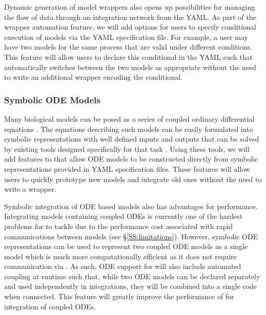 \documentclass[journal]{IEEEtran}
\newcommand{\todo}[1]{{\color{red}{#1}}}
\newcommand{\pkg}{{\tt \todo{cis\_interface}}{}}
\begin{document}
Dynamic generation of model wrappers also opens up possibilities for managing the flow of data through an integration network from the YAML. As part of the wrapper automation feature, we will add options for users to specify conditional execution of models via the YAML specification file. For example, a user may have two models for the same process that are valid under different conditions. This feature will allow users to declare this conditional in the YAML such that {\pkg} automatically switches between the two models as appropriate without the need to write an additional wrapper encoding the conditional.


\subsubsection{Symbolic ODE Models}\label{SS:ODE}
%
Many biological models can be posed as a series of coupled ordinary differential equations \citep[ODEs, ][]{WANG2015}. The equations describing such models can be easily formulated into symbolic representations \citep[e.g. SymPy][]{Meurer2017} with well defined inputs and outputs that can be solved by existing tools designed specifically for that task \citep[e.g. scipy.integrate.ode][]{Jones2001, Hairer1993}. Using these tools, we will add features to {\pkg} that allow ODE models to be constructed directly from symbolic representations provided in YAML specification files. These features will allow users to quickly prototype new models and integrate old ones without the need to write a wrapper.

Symbolic integration of ODE based models also has advantages for performance. Integrating models containing coupled ODEs is currently one of the hardest problems for {\pkg} to tackle due to the performance cost associated with rapid communications between models (see \S\ref{SS:limitations}). However, symbolic ODE representations can be used to represent two coupled ODE models as a single model which is much more computationally efficient as it does not require communication via {\pkg}. As such, ODE support for {\pkg} will also include automated coupling at runtime such that, while two ODE models can be declared separately and used independently in integrations, they will be combined into a single code when connected. This feature will greatly improve the performance of {\pkg} for integration of coupled ODEs.

\end{document}

